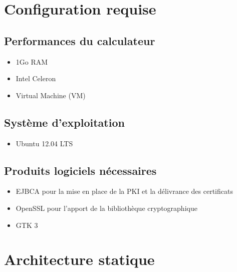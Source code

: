 \documentclass[a4paper,11pt,french]{article}
\begin{document}
\section{Configuration requise}
\vspace{0.8cm}
\subsection{Performances du calculateur}
\begin{itemize}
\item 1Go RAM 
\item Intel Celeron
\item Virtual Machine (VM)
\end{itemize}
\vspace{0.3cm}
\subsection{Système d’exploitation}
\begin{itemize}
\item Ubuntu 12.04 LTS
\end{itemize}
\vspace{0.3cm}
\subsection{Produits logiciels nécessaires}
\begin{itemize}
\item EJBCA pour la mise en place de la PKI et la délivrance des certificats
\item OpenSSL pour l'apport de la bibliothèque cryptographique
\item GTK 3
\end{itemize}

\vspace{0.8cm}
\section{Architecture statique}
\vspace{0.3cm}
\end{document}
